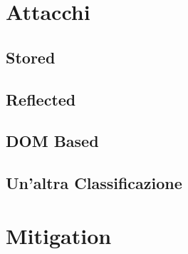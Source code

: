 \section{Attacchi}

\subsection{Stored}

\subsection{Reflected}

\subsection{DOM Based}

\subsection{Un'altra Classificazione}

\section{Mitigation}